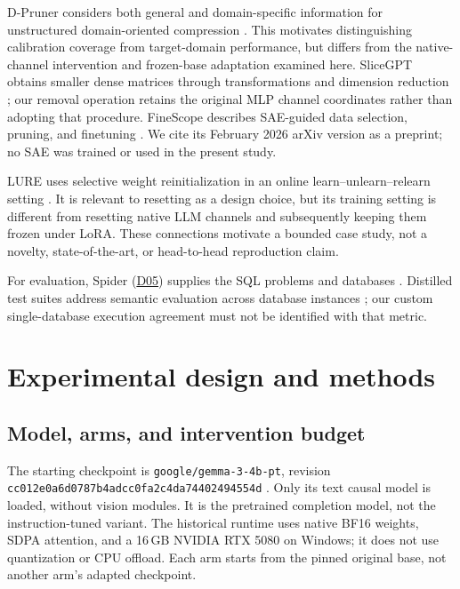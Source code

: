 \documentclass[10pt,letterpaper]{article}
\DeclareRobustCommand{\dataset}[1]{\hyperlink{dataset-#1}{\textnormal{#1}}}
\begin{document}
D-Pruner considers both general and domain-specific information for
unstructured domain-oriented compression \citep{zhang2024dpruner}. This
motivates distinguishing calibration coverage from target-domain performance,
but differs from the native-channel intervention and frozen-base adaptation
examined here. SliceGPT obtains smaller dense matrices through transformations
and dimension reduction \citep{ashkboos2024slicegpt}; our removal operation
retains the original MLP channel coordinates rather than adopting that
procedure. FineScope describes SAE-guided data selection, pruning, and
finetuning \citep{bhattacharyya2026finescope}. We cite its February 2026
arXiv version as a preprint; no SAE was trained or used in the present study.

LURE uses selective weight reinitialization in an online
learn--unlearn--relearn setting \citep{ramkumar2023lure}. It is relevant to
resetting as a design choice, but its training setting is different from
resetting native LLM channels and subsequently keeping them frozen under
LoRA. These connections motivate a bounded case study, not a novelty,
state-of-the-art, or head-to-head reproduction claim.

For evaluation, Spider (\dataset{D05}) supplies the SQL problems and databases
\citep{yu2018spider}. Distilled test suites address semantic evaluation across
database instances \citep{zhong2020semantic}; our custom single-database
execution agreement must not be identified with that metric.

\section{Experimental design and methods}
\label{sec:methods}

\subsection{Model, arms, and intervention budget}

The starting checkpoint is \texttt{google/gemma-3-4b-pt}, revision
\nolinkurl{cc012e0a6d0787b4adcc0fa2c4da74402494554d}
\citep{gemmateam2025gemma}. Only its text causal model is loaded, without
vision modules. It is the pretrained completion model, not the
instruction-tuned variant. The historical runtime uses native BF16 weights,
SDPA attention, and a 16\,GB NVIDIA RTX 5080 on Windows; it does not use
quantization or CPU offload. Each arm starts from the pinned original base,
not another arm's adapted checkpoint.
\end{document}
